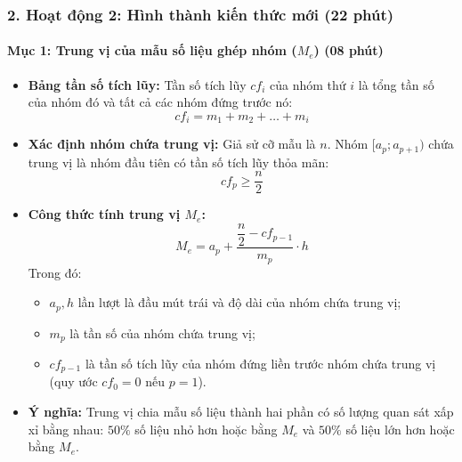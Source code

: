 \documentclass[12pt, a4paper]{article}
\begin{document}
\subsubsection*{2. Hoạt động 2: Hình thành kiến thức mới (22 phút)}

\paragraph{Mục 1: Trung vị của mẫu số liệu ghép nhóm ($M_e$) (08 phút)}
\begin{itemize}
    \item \textbf{Bảng tần số tích lũy:} Tần số tích lũy $cf_i$ của nhóm thứ $i$ là tổng tần số của nhóm đó và tất cả các nhóm đứng trước nó:
    $$cf_i = m_1 + m_2 + \dots + m_i$$
    \item \textbf{Xác định nhóm chứa trung vị:} Giả sử cỡ mẫu là $n$. Nhóm $[a_p; a_{p+1})$ chứa trung vị là nhóm đầu tiên có tần số tích lũy thỏa mãn:
    $$cf_p \ge \dfrac{n}{2}$$
    \item \textbf{Công thức tính trung vị $M_e$:}
    $$M_e = a_p + \dfrac{\dfrac{n}{2} - cf_{p-1}}{m_p} \cdot h$$
    Trong đó:
    \begin{itemize}
        \item $a_p, h$ lần lượt là đầu mút trái và độ dài của nhóm chứa trung vị;
        \item $m_p$ là tần số của nhóm chứa trung vị;
        \item $cf_{p-1}$ là tần số tích lũy của nhóm đứng liền trước nhóm chứa trung vị (quy ước $cf_0 = 0$ nếu $p = 1$).
    \end{itemize}
    \item \textbf{Ý nghĩa:} Trung vị chia mẫu số liệu thành hai phần có số lượng quan sát xấp xỉ bằng nhau: $50\%$ số liệu nhỏ hơn hoặc bằng $M_e$ và $50\%$ số liệu lớn hơn hoặc bằng $M_e$.
\end{itemize}
\end{document}
